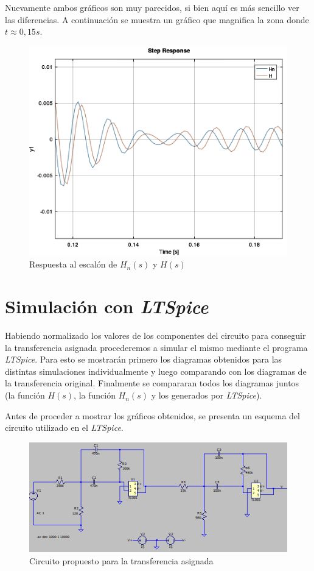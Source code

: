 \documentclass[11pt,a4paper]{report}
\begin{document}
Nuevamente ambos gráficos son muy parecidos, si bien aquí es más sencillo ver las
diferencias. A continuación se muestra un gráfico que magnifica la zona donde $t \approx 0,15s$.

\begin{figure}[h!]
\centering
\includegraphics[scale=0.48]{RtaEscalonCloseComp.png}
\caption{Respuesta al escalón de $H_{n}(s)$ y $H(s)$}
\end{figure}

\section*{Simulación con \textit{LTSpice}}

Habiendo normalizado los valores de los componentes del circuito para conseguir la
transferencia asignada procederemos a simular el mismo mediante el programa \textit{LTSpice}. Para esto se mostrarán primero los diagramas obtenidos para las
distintas simulaciones individualmente y luego comparando con los diagramas de la
transferencia original. Finalmente se compararan todos los diagramas juntos (la función $H(s)$, la función $H_{n}(s)$ y los generados por \textit{LTSpice}).

\bigskip
Antes de proceder a mostrar los gráficos obtenidos, se presenta un esquema del circuito utilizado en el \textit{LTSpice}.

\vspace{20 mm}

\begin{figure}[h!]
\centering
\includegraphics[scale=1]{Circuito.png}
\caption{Circuito propuesto para la transferencia asignada}
\end{figure}
\end{document}
